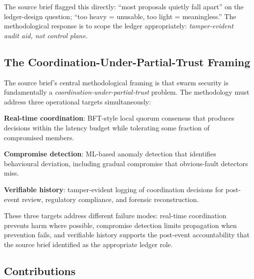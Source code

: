 \documentclass[sigconf,nonacm]{acmart}
\begin{document}
The source brief flagged this directly: ``most proposals quietly
fall apart'' on the ledger-design question; ``too heavy = unusable,
too light = meaningless.'' The methodological response is to scope
the ledger appropriately: \emph{tamper-evident audit aid, not
control plane}.

\subsection{The Coordination-Under-Partial-Trust Framing}

The source brief's central methodological framing is that swarm
security is fundamentally a \emph{coordination-under-partial-trust}
problem. The methodology must address three operational targets
simultaneously:

\textbf{Real-time coordination}: BFT-style local quorum consensus
that produces decisions within the latency budget while tolerating
some fraction of compromised members.

\textbf{Compromise detection}: ML-based anomaly detection that
identifies behavioural deviation, including gradual compromise
that obvious-fault detectors miss.

\textbf{Verifiable history}: tamper-evident logging of coordination
decisions for post-event review, regulatory compliance, and
forensic reconstruction.

These three targets address different failure modes:
real-time coordination prevents harm where possible, compromise
detection limits propagation when prevention fails, and verifiable
history supports the post-event accountability that the source brief
identified as the appropriate ledger role.

\subsection{Contributions}
\end{document}
